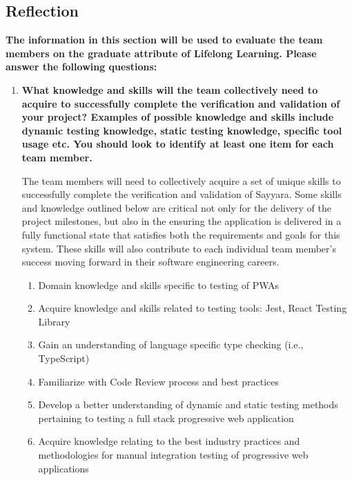 \documentclass[12pt, titlepage]{article}
\begin{document}
\subsection{Reflection}

\textbf{The information in this section will be used to evaluate the team members on the graduate attribute
	of Lifelong Learning. Please answer the following questions:}

\begin{enumerate}
	\item \textbf{What knowledge and skills will the team collectively need to acquire to successfully complete the
		      verification and validation of your project? Examples of possible knowledge and skills include
		      dynamic testing knowledge, static testing knowledge, specific tool usage etc. You should look to
		      identify at least one item for each team member.}

	      The team members will need to collectively acquire a set of unique skills to successfully complete
	      the verification and validation of Sayyara. Some skills and knowledge outlined below are critical
	      not only for the delivery of the project milestones, but also in the ensuring the application is
	      delivered in a fully functional state that satisfies both the requirements and goals for this
	      system. These skills will also contribute to each individual team member's success moving forward
	      in their software engineering careers.

	      \begin{enumerate}[\arabic*.]
		      \item Domain knowledge and skills specific to testing of PWAs
		      \item Acquire knowledge and skills related to testing tools: Jest, React Testing Library
		      \item Gain an understanding of language specific type checking (i.e., TypeScript)
		      \item Familiarize with Code Review process and best practices
		      \item Develop a better understanding of dynamic and static testing methods pertaining to testing a full
		            stack progressive web application
		      \item Acquire knowledge relating to the best industry practices and methodologies for manual integration
		            testing of progressive web applications
	      \end{enumerate}


\end{enumerate}
\end{document}
